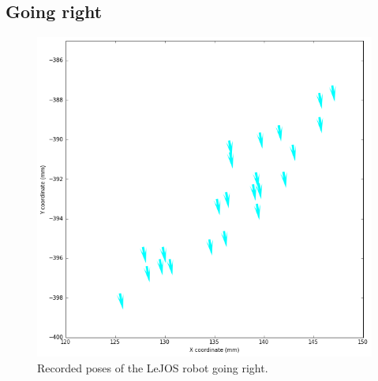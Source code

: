 \documentclass[paper=a4, fontsize=11pt]{scrartcl} %
\begin{document}
\subsection{Going right}
\begin{figure}[h!]
    \begin{center}
        \setlength{\fboxsep}{0.5pt} %
        \setlength{\fboxrule}{0.5pt}
        \includegraphics[width=12cm,fbox]{images/poses_plot_5_right.png}
        \caption{Recorded poses of the LeJOS robot going right.}
    \end{center}
\end{figure}
\end{document}
